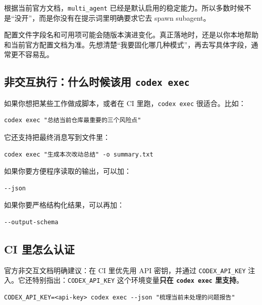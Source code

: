 \documentclass[UTF8,a4paper,12pt]{ctexart}
\begin{document}
\begin{tipbox}
根据当前官方文档，\texttt{multi\_agent} 已经是默认启用的稳定能力。所以多数时候不是“没开”，而是你没有在提示词里明确要求它去 spawn subagent。
\end{tipbox}

\begin{warnbox}
配置文件字段名和可用项可能会随版本演进变化。真正落地时，还是以你本地帮助和当前官方配置文档为准。先想清楚“我要固化哪几种模式”，再去写具体字段，通常更不容易乱。
\end{warnbox}

\subsection{非交互执行：什么时候该用 \texttt{codex exec}}

如果你想把某些工作做成脚本，或者在 CI 里跑，\texttt{codex exec} 很适合。比如：

\begin{lstlisting}[style=cli]
codex exec "总结当前仓库最重要的三个风险点"
\end{lstlisting}

它还支持把最终消息写到文件里：

\begin{lstlisting}[style=cli]
codex exec "生成本次改动总结" -o summary.txt
\end{lstlisting}

如果你要方便程序读取的输出，可以加：

\begin{lstlisting}[style=cli]
--json
\end{lstlisting}

如果你要严格结构化结果，可以再加：

\begin{lstlisting}[style=cli]
--output-schema
\end{lstlisting}

\subsection{CI 里怎么认证}

官方非交互文档明确建议：在 CI 里优先用 API 密钥，并通过 \texttt{CODEX\_API\_KEY} 注入。它还特别指出：\texttt{CODEX\_API\_KEY} 这个环境变量\textbf{只在 \texttt{codex exec} 里支持}。

\begin{lstlisting}[style=cli]
CODEX_API_KEY=<api-key> codex exec --json "梳理当前未处理的问题报告"
\end{lstlisting}
\end{document}
